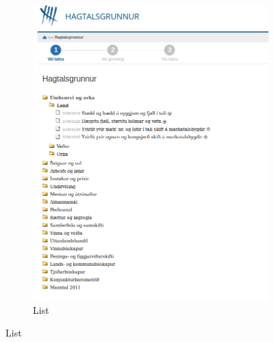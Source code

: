 \begin{figure}[H]
  \centering
  \begin{subfigure}[b]{0.3\linewidth}
    \includegraphics[width=\linewidth]{img/ui1.png}
    \caption{List}
    \label{fig:List}
    

\end{subfigure}
\end{figure}
